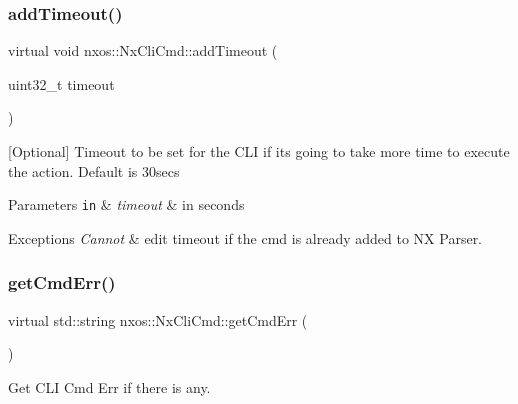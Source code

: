 \subsubsection{\texorpdfstring{add\+Timeout()}{addTimeout()}}
{\footnotesize\ttfamily virtual void nxos\+::\+Nx\+Cli\+Cmd\+::add\+Timeout (\begin{DoxyParamCaption}\item[{uint32\+\_\+t}]{timeout }\end{DoxyParamCaption})\hspace{0.3cm}{\ttfamily [pure virtual]}}

\mbox{[}Optional\mbox{]} Timeout to be set for the C\+LI if its going to take more time to execute the action. Default is 30secs 
\begin{DoxyParams}[1]{Parameters}
\mbox{\tt in}  & {\em timeout} & in seconds\\
\hline
\end{DoxyParams}

\begin{DoxyExceptions}{Exceptions}
{\em Cannot} & edit timeout if the cmd is already added to NX Parser. \\
\hline
\end{DoxyExceptions}
\mbox{\label{classnxos_1_1_nx_cli_cmd_aa4321d9b60ecb1366157d0ef9356ffbf}} 
\subsubsection{\texorpdfstring{get\+Cmd\+Err()}{getCmdErr()}}
{\footnotesize\ttfamily virtual std\+::string nxos\+::\+Nx\+Cli\+Cmd\+::get\+Cmd\+Err (\begin{DoxyParamCaption}{ }\end{DoxyParamCaption})\hspace{0.3cm}{\ttfamily [pure virtual]}}



Get C\+LI Cmd Err if there is any. 

\mbox{\label{classnxos_1_1_nx_cli_cmd_a3d856a7d4350f027df53960053901c96}} 
